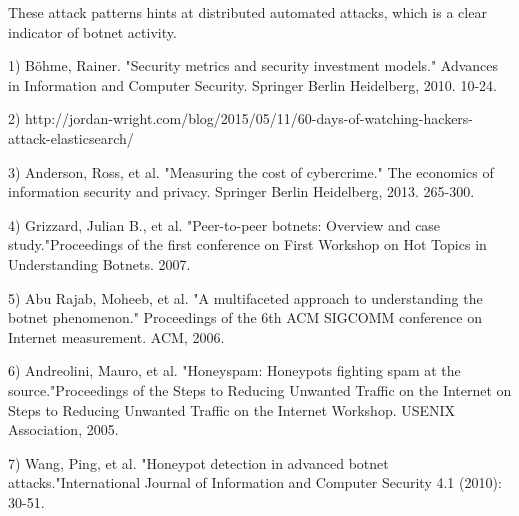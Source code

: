 \documentclass[a4paper]{article}
\begin{document}
These attack patterns hints at distributed automated attacks, which is a clear indicator of botnet activity.

1) Böhme, Rainer. "Security metrics and security investment models." Advances in Information and Computer Security. Springer Berlin Heidelberg, 2010. 10-24.

2) http://jordan-wright.com/blog/2015/05/11/60-days-of-watching-hackers-attack-elasticsearch/

3) Anderson, Ross, et al. "Measuring the cost of cybercrime." The economics of information security and privacy. Springer Berlin Heidelberg, 2013. 265-300.

4) Grizzard, Julian B., et al. "Peer-to-peer botnets: Overview and case study."Proceedings of the first conference on First Workshop on Hot Topics in Understanding Botnets. 2007.

5) Abu Rajab, Moheeb, et al. "A multifaceted approach to understanding the botnet phenomenon." Proceedings of the 6th ACM SIGCOMM conference on Internet measurement. ACM, 2006.

6) Andreolini, Mauro, et al. "Honeyspam: Honeypots fighting spam at the source."Proceedings of the Steps to Reducing Unwanted Traffic on the Internet on Steps to Reducing Unwanted Traffic on the Internet Workshop. USENIX Association, 2005.

7) Wang, Ping, et al. "Honeypot detection in advanced botnet attacks."International Journal of Information and Computer Security 4.1 (2010): 30-51.
\end{document}
